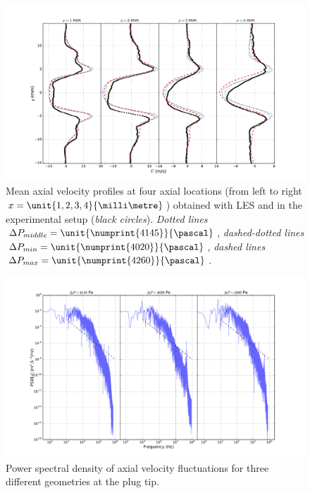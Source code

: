\begin{figure}[!ht]
\centering
\includegraphics[width=\linewidth,keepaspectratio]{fig/applications/swirler/profile_u.pdf}
\caption{Mean axial velocity profiles at four axial locations (from left to right $x = \unit{1, 2, 3, 4}{\milli\metre}$) obtained with LES and in the experimental setup (\emph{black circles}). \emph{Dotted lines} $\Delta P_{middle} =\unit{\numprint{4145}}{\pascal} $, \emph{dashed-dotted lines}$\Delta P_{min} =\unit{\numprint{4020}}{\pascal} $, \emph{dashed lines} $\Delta P_{max} = \unit{\numprint{4260}}{\pascal}$.}
\label{fig:profile-u}
\end{figure}

\begin{figure}[!ht]
\centering
\includegraphics[width=\linewidth,keepaspectratio]{fig/applications/swirler/psd_u.pdf}
\caption{Power spectral density of axial velocity fluctuations for three different geometries at the plug tip.}
\label{fig:psd-u}
\end{figure}



